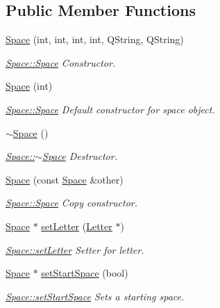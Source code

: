 \subsection*{Public Member Functions}
\begin{DoxyCompactItemize}
\item 
\hyperlink{class_space_a215e62ed852d6f6ba3de07d91c9ff236}{Space} (int, int, int, int, Q\-String, Q\-String)
\begin{DoxyCompactList}\small\item\em \hyperlink{class_space_a215e62ed852d6f6ba3de07d91c9ff236}{Space\-::\-Space} Constructor. \end{DoxyCompactList}\item 
\hyperlink{class_space_a7ccd72aff73f5e5c274790009cdbaf37}{Space} (int)
\begin{DoxyCompactList}\small\item\em \hyperlink{class_space_a215e62ed852d6f6ba3de07d91c9ff236}{Space\-::\-Space} Default constructor for space object. \end{DoxyCompactList}\item 
\hyperlink{class_space_a06d440a35bcb4b1554b69e8b18d53705}{$\sim$\-Space} ()
\begin{DoxyCompactList}\small\item\em \hyperlink{class_space_a06d440a35bcb4b1554b69e8b18d53705}{Space\-::$\sim$\-Space} Destructor. \end{DoxyCompactList}\item 
\hyperlink{class_space_adb7de4055fa9c105d8f62f83660806ce}{Space} (const \hyperlink{class_space}{Space} \&other)
\begin{DoxyCompactList}\small\item\em \hyperlink{class_space_a215e62ed852d6f6ba3de07d91c9ff236}{Space\-::\-Space} Copy constructor. \end{DoxyCompactList}\item 
\hyperlink{class_space}{Space} $\ast$ \hyperlink{class_space_aab86690461768d190a009e06c753f2ce}{set\-Letter} (\hyperlink{class_letter}{Letter} $\ast$)
\begin{DoxyCompactList}\small\item\em \hyperlink{class_space_aab86690461768d190a009e06c753f2ce}{Space\-::set\-Letter} Setter for letter. \end{DoxyCompactList}\item 
\hyperlink{class_space}{Space} $\ast$ \hyperlink{class_space_a504f4eb0ec7193df72b161745aa8086e}{set\-Start\-Space} (bool)
\begin{DoxyCompactList}\small\item\em \hyperlink{class_space_a504f4eb0ec7193df72b161745aa8086e}{Space\-::set\-Start\-Space} Sets a starting space. \end{DoxyCompactList}\item 

\end{DoxyCompactItemize}
